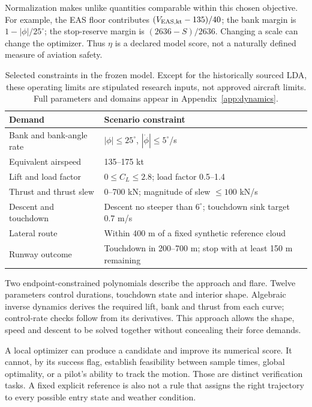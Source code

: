 Normalization makes unlike quantities comparable within this chosen objective. For example, the EAS floor contributes $(V_{\rm EAS,kt}-135)/40$; the bank margin is $1-|\phi|/25^\circ$; the stop-reserve margin is $(2636-S)/2636$. Changing a scale can change the optimizer. Thus $\eta$ is a declared model score, not a naturally defined measure of aviation safety.

\begin{table}[H]\small
\caption{Selected constraints in the frozen model. Except for the historically sourced LDA, these operating limits are stipulated research inputs, not approved aircraft limits. Full parameters and domains appear in Appendix~\ref{app:dynamics}.}
\begin{tabularx}{\textwidth}{@{}p{}X@{}}\toprule
Demand & Scenario constraint\\\midrule
Bank and bank-angle rate & $|\phi|\leq25^\circ$, $|\dot\phi|\leq5^\circ$/s\\
Equivalent airspeed & 135--175 kt\\
Lift and load factor & $0\leq C_L\leq2.8$; load factor 0.5--1.4\\
Thrust and thrust slew & 0--700 kN; magnitude of slew $\leq100$ kN/s\\
Descent and touchdown & Descent no steeper than $6^\circ$; touchdown sink target 0.7 m/s\\
Lateral route & Within 400 m of a fixed synthetic reference cloud\\
Runway outcome & Touchdown in 200--700 m; stop with at least 150 m remaining\\\bottomrule
\end{tabularx}\end{table}

Two endpoint-constrained polynomials describe the approach and flare. Twelve parameters control durations, touchdown state and interior shape. Algebraic inverse dynamics derives the required lift, bank and thrust from each curve; control-rate checks follow from its derivatives. This approach allows the shape, speed and descent to be solved together without concealing their force demands.

A local optimizer can produce a candidate and improve its numerical score. It cannot, by its success flag, establish feasibility between sample times, global optimality, or a pilot's ability to track the motion. Those are distinct verification tasks. A fixed explicit reference is also not a rule that assigns the right trajectory to every possible entry state and weather condition.
\par\medskip
